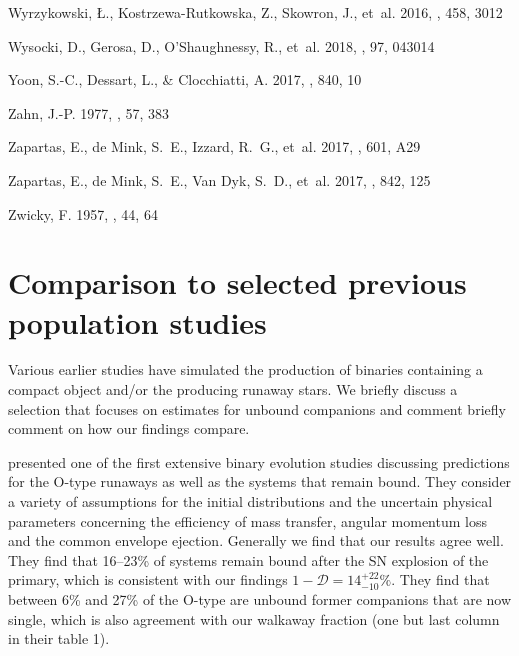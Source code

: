 \documentclass{aa}
\begin{document}
\begin{thebibliography}{242}
{Wyrzykowski}, {\L}., {Kostrzewa-Rutkowska}, Z., {Skowron}, J., {et~al.} 2016,
  \mnras, 458, 3012

{Wysocki}, D., {Gerosa}, D., {O'Shaughnessy}, R., {et~al.} 2018, \prd, 97,
  043014

{Yoon}, S.-C., {Dessart}, L., \& {Clocchiatti}, A. 2017, \apj, 840, 10

{Zahn}, J.-P. 1977, \aap, 57, 383

{Zapartas}, E., {de Mink}, S.~E., {Izzard}, R.~G., {et~al.} 2017{},
  \aap, 601, A29

{Zapartas}, E., {de Mink}, S.~E., {Van Dyk}, S.~D., {et~al.}
  2017{}, \apj, 842, 125

{Zwicky}, F. 1957, \zap, 44, 64

\end{thebibliography}

\appendix

\section{Comparison to selected previous population studies}
\label{sec:literature}

Various earlier studies have simulated the production of binaries
containing a compact object and/or the producing runaway stars. We briefly discuss a selection that focuses on estimates for unbound companions and comment briefly comment on how our findings compare. 

\cite{dedonder:97} presented one of the first extensive binary evolution studies discussing predictions for the O-type runaways as well as the systems that remain bound. They consider a variety of assumptions for the initial distributions and the uncertain physical parameters concerning the efficiency of mass transfer, angular momentum loss and the common envelope ejection. Generally we find that our results agree well.  They find that 16--23\% of systems remain bound after the SN explosion of the primary, which is consistent with our findings $1- \mathcal{D} = 14^{+22}_{-10}\%$.  They find that between 6\% and 27\% of the O-type are unbound former companions that are now single, which is also agreement with our walkaway fraction (one but last column in their table 1). 
\end{document}

